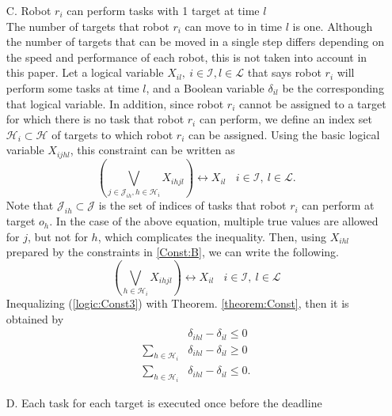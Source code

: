 \documentclass[]{interact}
\theoremstyle{plain}%
\theoremstyle{definition}
\theoremstyle{remark}
\begin{document}
\begin{itemize}
    \item[C.] Robot $r_i$ can perform tasks with 1 target at time $l$\label{Const:C} \mbox{}\\
            The number of targets that robot $r_i$ can move to in time $l$ is one.
            Although the number of targets that can be moved in a single step differs depending on the speed and performance of each robot, this is not taken into account in this paper.
            Let a logical variable $X_{il},~i\in\mathcal{I},l\in\mathcal{L}$ that says robot $r_i$ will perform some tasks at time $l$, and a Boolean variable $\delta_{il}$ be the corresponding
            that logical variable.
            In addition, since robot $r_i$ cannot be assigned to a target for which there is no task that robot $r_i$ can perform, we define an index set $\mathcal{H}_i\subset\mathcal{H}$ of targets to which robot $r_i$ can be assigned.
            Using the basic logical variable $X_{ijhl}$, this constraint can be written as 
            \begin{equation}
                \left(\bigvee_{j\in\mathcal{J}_{ih},h\in\mathcal{H}_i}X_{ihjl}\right)\leftrightarrow X_{il}~~~~i\in\mathcal{I},~l\in\mathcal{L}.
            \end{equation}
            Note that $\mathcal{J}_{ih}\subset\mathcal{J}$ is the set of indices of tasks that robot $r_i$ can perform at target $o_h$.
            In the case of the above equation, multiple true values are allowed for $j$, but not for $h$, which complicates the inequality.
            Then, using $X_{ihl}$ prepared by the constraints in \ref{Const:B}, we can write the following.
            \begin{equation}\label{logic:Const3}
                \left(\bigvee_{h\in\mathcal{H}_i}X_{ihjl}\right)\leftrightarrow X_{il}~~~~i\in\mathcal{I},~l\in\mathcal{L}
            \end{equation}
            Inequalizing (\ref{logic:Const3}) with Theorem. \ref{theorem:Const}, then it is obtained by
            \begin{align*}
                &\delta_{ihl}-\delta_{il}\le 0\\
                \sum_{h\in\mathcal{H}_{i}}&\delta_{ihl}-\delta_{il}\ge 0\\
                \sum_{h\in\mathcal{H}_{i}}&\delta_{ihl}-\delta_{il}\le 0.
            \end{align*}

    \item[D.] Each task for each target is executed once before the deadline\label{Const:D} \mbox{}\\
            
    \item[] 



\end{itemize}
\end{document}
